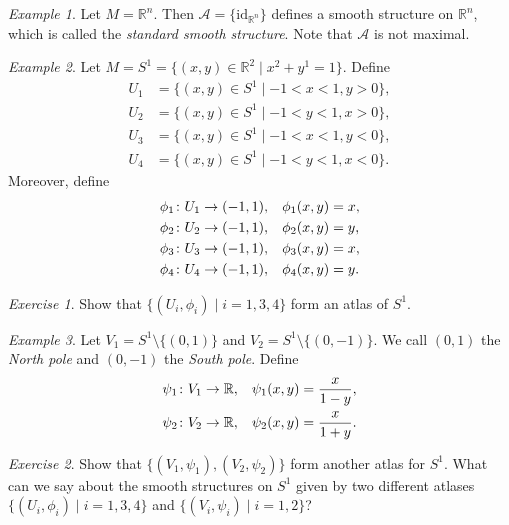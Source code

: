 \documentclass[12pt]{amsart}
\numberwithin{equation}{section}
\theoremstyle{plain}
\theoremstyle{definition}
\theoremstyle{remark}
\newtheorem{exe}{Exercise}[subsection]
\newtheorem{ex}{Example}[subsection]
\newcommand{\R}{\mathbb{R}}
\newcommand{\id}{\mathrm{id}}
\newcommand{\calA}{\mathcal{A}}
\begin{document}
\begin{ex}
Let $M=\R^n$. Then $\calA=\{\id_{\R^n}\}$ defines a smooth structure on $\R^n$, which is called the \emph{standard smooth structure}. Note that $\calA$ is not maximal.
\end{ex}


\begin{ex}
Let $M=S^1=\{(x,y)\in\R^2\mid x^2+y^1=1\}$. Define 
\begin{align*}
U_1&=\{(x,y)\in S^1\mid -1<x<1,y>0\},\\
U_2&=\{(x,y)\in S^1\mid -1<y<1,x>0\},\\
U_3&=\{(x,y)\in S^1\mid -1<x<1,y<0\},\\
U_4&=\{(x,y)\in S^1\mid -1<y<1,x<0\}.
\end{align*}
Moreover, define
\begin{align*}
\phi_1\colon U_1&\to (-1,1),\hspace{0.3cm}\phi_1(x,y)=x,\\
\phi_2\colon U_2&\to (-1,1),\hspace{0.3cm}\phi_2(x,y)=y,\\
\phi_3\colon U_3&\to (-1,1),\hspace{0.3cm}\phi_3(x,y)=x,\\
\phi_4\colon U_4&\to (-1,1),\hspace{0.3cm}\phi_4(x,y)=y.\\
\end{align*}
\end{ex}


\begin{exe}
Show that $\{(U_i,\phi_i)\mid i=1,3,4\}$ form an atlas of $S^1$.
\end{exe}

\begin{ex}
Let $V_1=S^1\setminus\{(0,1)\}$ and $V_2=S^1\setminus\{(0,-1)\}$. We call $(0,1)$ the \emph{North pole} and $(0,-1)$ the \emph{South pole}. Define 
\begin{align*}
\psi_1\colon V_1&\to \R, \hspace{0.3cm}\psi_1(x,y)=\frac{x}{1-y},\\
\psi_2\colon V_2&\to \R, \hspace{0.3cm}\psi_2(x,y)=\frac{x}{1+y}.
\end{align*}
\end{ex}

\begin{exe}
Show that $\{(V_1,\psi_1),(V_2,\psi_2)\}$ form another atlas for $S^1$. What can we say about the smooth structures on $S^1$ given by two different atlases $\{(U_i,\phi_i)\mid i=1,3,4\}$ and $\{(V_i,\psi_i)\mid i=1,2\}$?
\end{exe}
\end{document}
